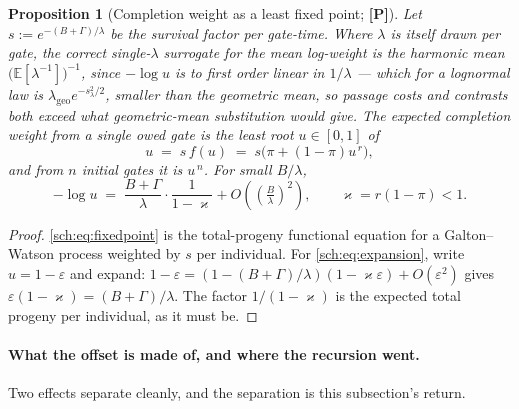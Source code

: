 \documentclass[11pt]{article}
\numberwithin{equation}{section}
\theoremstyle{plain}
\newtheorem{proposition}[theorem]{Proposition}
\theoremstyle{definition}
\theoremstyle{remark}
\newcommand{\E}{\mathbb{E}}
\begin{document}
\begin{proposition}[Completion weight as a least fixed point;
\textbf{[P]}]\label{sch:prop:fixedpoint}
Let $s:=e^{-(B+\Gamma)/\lambda}$ be the survival factor per gate-time.
Where $\lambda$ is itself drawn per gate, the correct single-$\lambda$
surrogate for the mean log-weight is the \emph{harmonic} mean
$\bigl(\E[\lambda^{-1}]\bigr)^{-1}$, since $-\log u$ is to first order
linear in $1/\lambda$ --- which for a lognormal law is
$\lambda_{\mathrm{geo}}e^{-s_\lambda^{2}/2}$, smaller than the geometric
mean, so passage costs and contrasts both exceed what
geometric-mean substitution would give. The
expected completion weight from a single owed gate is the least root
$u\in[0,1]$ of
\begin{equation}\label{sch:eq:fixedpoint}
u\;=\;s\,f(u)\;=\;s\bigl(\pi+(1-\pi)u^{\,r}\bigr),
\end{equation}
and from $n$ initial gates it is $u^{\,n}$. For small $B/\lambda$,
\begin{equation}\label{sch:eq:expansion}
-\log u\;=\;\frac{B+\Gamma}{\lambda}\cdot\frac{1}{1-\varkappa}
+O\!\left(\left(\tfrac{B}{\lambda}\right)^{2}\right),
\qquad \varkappa=r(1-\pi)<1 .
\end{equation}
\end{proposition}

\begin{proof}
\eqref{sch:eq:fixedpoint} is the total-progeny functional equation for a
Galton--Watson process weighted by $s$ per individual. For
\eqref{sch:eq:expansion}, write $u=1-\varepsilon$ and expand:
$1-\varepsilon=(1-(B+\Gamma)/\lambda)(1-\varkappa\varepsilon)+O(\varepsilon^{2})$
gives $\varepsilon(1-\varkappa)=(B+\Gamma)/\lambda$. The factor $1/(1-\varkappa)$ is the expected total
progeny per individual, as it must be.
\end{proof}

\paragraph{What the offset is made of, and where the recursion
went.}\label{sch:rem:cefff}
Two effects separate cleanly, and the separation is this subsection's
return.
\end{document}
